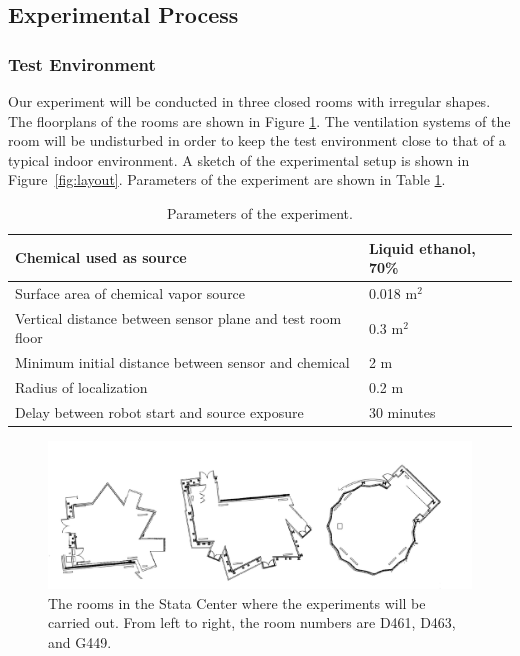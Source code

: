 \documentclass[submit]{aiaa-pretty-modified}
\newcommand{\tablewidthtwo}[0]{3in}
\begin{document}
\subsection{Experimental Process}
\subsubsection{Test Environment}

Our experiment will be conducted in three closed rooms with irregular shapes.
The floorplans of the rooms are shown in Figure \ref{fig:floorplans}. The
ventilation systems of the room will be undisturbed in order to keep the test
environment close to that of a typical indoor environment. A sketch of the
experimental setup is shown in Figure~\ref{fig:layout}. Parameters of the
experiment are shown in Table \ref{tab:parameters}.

\begin{table}
\caption{Parameters of the experiment.}
\begin{center}
\begin{tabular}{|p{\tablewidthtwo}|p{\tablewidthtwo}|}
\hline
Chemical used as source & Liquid ethanol, 70\% \\ \hline
Surface area of chemical vapor source & 0.018 $\text{m}^2$\\ \hline
Vertical distance between sensor plane and
test room floor & 0.3 $\text{m}^2$ \\ \hline
Minimum initial distance between sensor and chemical & 2 $\text{m}$ \\ \hline
Radius of localization & 0.2 $\text{m}$ \\ \hline
Delay between robot start and source exposure & 30 minutes \\ \hline
\end{tabular}
\end{center}
\label{tab:parameters}
\end{table}

\begin{figure}
\begin{center}
\includegraphics[width=7in]{img/rooms.pdf}
\caption{The rooms in the Stata Center where the experiments will
  be carried out.  From left to right, the room numbers are D461,
  D463, and G449.}
\label{fig:floorplans}
\end{center}
\end{figure}
\end{document}
